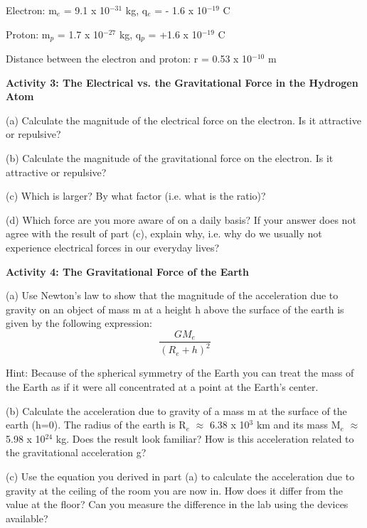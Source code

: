 Electron: m\( _{e} \) = 9.1 x 10\( ^{-31} \) kg, q\( _{e} \) = - 1.6 x 10\( ^{-19} \)
C 

Proton: m\( _{p} \) = 1.7 x 10\( ^{-27} \) kg, q\( _{p} \) = +1.6 x 10\( ^{-19} \)
C 

Distance between the electron and proton: r = 0.53 x 10\( ^{-10} \) m

\textbf{Activity 3: The Electrical vs. the Gravitational Force in the Hydrogen
Atom}

(a) Calculate the magnitude of the electrical force on the electron. Is it attractive
or repulsive?
\vspace{20mm}

(b) Calculate the magnitude of the gravitational force on the electron. Is it
attractive or repulsive?
\vspace{20mm}

(c) Which is larger? By what factor (i.e. what is the ratio)?
\vspace{20mm}

(d) Which force are you more aware of on a daily basis? If your answer does
not agree with the result of part (c), explain why, i.e. why do we usually not 
experience electrical forces in our everyday lives?
\vspace{20mm}

\textbf{Activity 4: The Gravitational Force of the Earth}

(a) Use Newton's law to show that the magnitude of the acceleration due to gravity
on an object of mass m at a height h above the surface of the earth is given by
the following expression:
\[
\frac{GM_{e}}{\left( R_{e}+h\right) ^{2}}\]


Hint: Because of the spherical symmetry of the Earth you can treat the mass
of the Earth as if it were all concentrated at a point at the Earth's center.
\vspace{40mm}

(b) Calculate the acceleration due to gravity of a mass m at the surface of
the earth (h=0). The radius of the earth is R\( _{e} \) \( \approx  \) 6.38
x 10\( ^{3} \) km and its mass M\( _{e} \) \( \approx  \) 5.98 x 10\( ^{24} \)
kg. Does the result look familiar? How is this acceleration related to the gravitational
acceleration g?
\vspace{40mm}

(c) Use the equation you derived in part (a) to calculate the acceleration due
to gravity at the ceiling of the room you are now in. How does it differ from
the value at the floor? Can you measure the difference in the lab using the
devices available?
\vspace{30mm}

